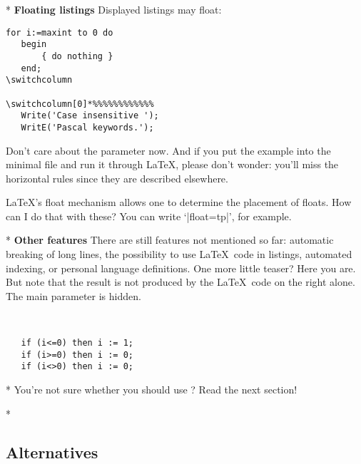 \begin{paracol}{2}
\switchcolumn[0]*%
\textbf{Floating listings}
Displayed listings may float:
\begin{lstsample}{\lstset{frame=tb}}{}
   \begin{lstlisting}[float,caption=A floating example]
   for i:=maxint to 0 do
   begin
       { do nothing }
   end;
\switchcolumn

\switchcolumn[0]*%%%%%%%%%%%%
   Write('Case insensitive ');
   WritE('Pascal keywords.');
   \end{lstlisting}
\end{lstsample}
Don't care about the parameter  now. And if you put the
example into the minimal file and run it through \LaTeX, please don't wonder:
you'll miss the horizontal rules since they are described elsewhere.
\begin{advise}
\item \LaTeX's float mechanism allows one to determine the placement of floats.
      How can I do that with these?
      \advisespace
      You can write `|float=tp|', for example.
\end{advise}
\switchcolumn

\switchcolumn[0]*%
\textbf{Other features}
There are still features not mentioned so far: automatic breaking of long
lines, the possibility to use \LaTeX\ code in listings, automated indexing,
or personal language definitions.
One more little teaser? Here you are. But note that the result is not
produced by the \LaTeX\ code on the right alone. The main parameter is
hidden.
\begin{lstsample}{^^A
  }{}
   \begin{lstlisting}
   if (i<=0) then i := 1;
   if (i>=0) then i := 0;
   if (i<>0) then i := 0;
   \end{lstlisting}
\end{lstsample}
\switchcolumn

\switchcolumn[0]*%
You're not sure whether you should use ?
Read the next section!
\switchcolumn

\switchcolumn[0]*%
\subsection{Alternatives}
\switchcolumn


\end{paracol}
